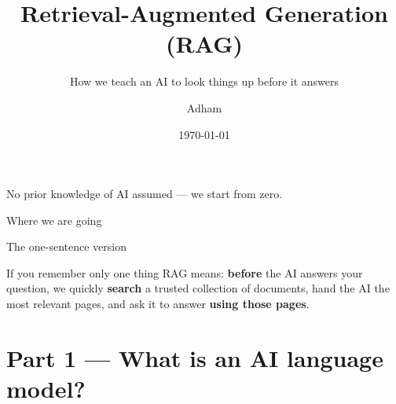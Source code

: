 \documentclass[aspectratio=169,11pt]{beamer}
\title[RAG: Teaching AI to Look Things Up]{Retrieval-Augmented Generation (RAG)}
\subtitle{How we teach an AI to look things up before it answers}
\author[RAG Talk]{Adham}
\institute{}
\date{\today}
\begin{document}
\begin{frame}[plain]
  \titlepage
  \begin{center}
    \small\color{raggray}
    No prior knowledge of AI assumed --- we start from zero.
  \end{center}
\end{frame}

\begin{frame}{Where we are going}
  \tableofcontents[pausesections]
\end{frame}

\begin{frame}{The one-sentence version}
  \vfill
  \begin{block}{If you remember only one thing}
    \large
    RAG means: \textbf{before} the AI answers your question, we quickly
    \textbf{search} a trusted collection of documents, hand the AI the most
    relevant pages, and ask it to answer \textbf{using those pages}.
  \end{block}
  \vfill
  \begin{center}
  \end{center}
  \vfill
  \centering\small\color{raggray}
\end{frame}

\section{Part 1 --- What is an AI language model?}
\end{document}
